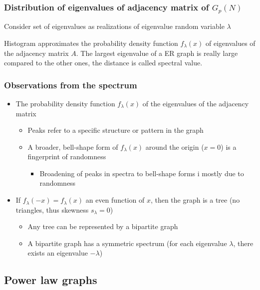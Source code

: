 \subsubsection{Distribution of eigenvalues of adjacency matrix of $G_p(N)$}

Consider set of eigenvalues as realizations of eigenvalue random variable $\lambda$

Histogram approximates the probability density function $f_{\lambda}(x)$ of eigenvalues
of the adjacency matrix $A$. The largest eigenvalue of a ER graph is really large compared to 
the other ones, the distance is called spectral value.

\subsubsection{Observations from the spectrum}

\begin{itemize}
  \item The probability density function $f_{\lambda}(x)$ of the eigenvalues of the adjacency
  matrix
  \begin{itemize}
    \item Peaks refer to a specific structure or pattern in the graph
    \item A broader, bell-shape form of $f_{\lambda}(x)$ around the origin ($x=0$) is
    a fingerprint of randomness
    \begin{itemize}
      \item Broadening of peaks in spectra to bell-shape forms i mostly due to randomness
    \end{itemize}
  \end{itemize}
  \item If $f_{\lambda}(-x) = f_{\lambda}(x)$ an even function of $x$, then the graph is a tree
  (no triangles, thus skewness $s_{\lambda} = 0$)
  \begin{itemize}
    \item Any tree can be represented by a bipartite graph
    \item A bipartite graph has a symmetric spectrum (for each eigenvalue $\lambda$, there
    exists an eigenvalue $-\lambda$)
  \end{itemize}
\end{itemize}

\subsection{Power law graphs}

